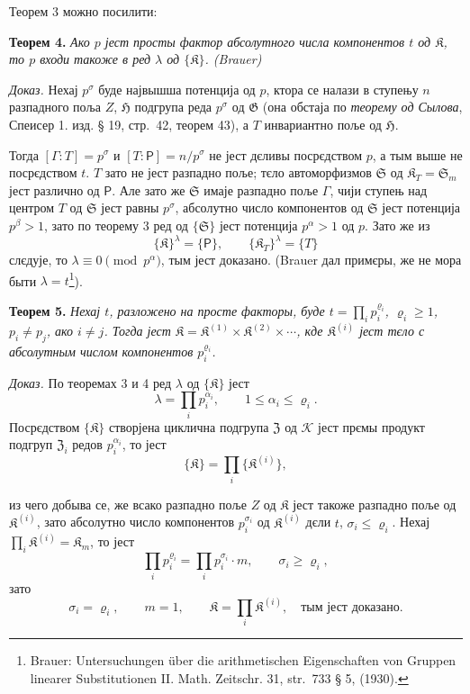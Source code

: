 \documentclass[11pt]{article}
\newcommand{\srcfn}[2]{\footnote{#2}}
\newcommand{\foreign}[1]{#1}
\begin{document}
Теорем 3 можно посилити:

\textbf{Теорем 4.} \emph{Ако \(p\) јест просты фактор абсолутного числа компонентов \(t\) од \(\mathfrak K\), то \(p\) входи такоже в ред \(\lambda\) од \(\{\mathfrak K\}\). (Brauer)}

\emph{Доказ.} Нехај \(p^\sigma\) буде највышша потенција од \(p\), ктора се налази в ступењу \(n\) разпадного поља \(Z\), \(\mathfrak H\) подгрупа реда \(p^\sigma\) од \(\mathfrak G\) (она обстаја по \emph{теорему од Сылова}, Спеисер 1. изд. § 19, стр.~42, теорем 43), а \(T\) инвариантно поље од \(\mathfrak H\).

Тогда \([\Gamma:T]=p^\sigma\) и \([T:\mathsf P]=n/p^\sigma\) не јест дєливы посрєдством \(p\), а тым выше не посрєдством \(t\). \(T\) зато не јест разпадно поље; тєло автоморфизмов \(\mathfrak S\) од \(\mathfrak K_T=\mathfrak S_m\) јест различно од \(\mathsf P\). Але зато же \(\mathfrak S\) имаје разпадно поље \(\Gamma\), чији ступењ над центром \(T\) од \(\mathfrak S\) јест равны \(p^\sigma\), абсолутно число компонентов од \(\mathfrak S\) јест потенција \(p^\beta>1\), зато по теорему 3 ред од \(\{\mathfrak S\}\) јест потенција \(p^\alpha>1\) од \(p\). Зато же из
\[
\{\mathfrak K\}^{\lambda}=\{\mathsf P\},
\qquad
\{\mathfrak K_T\}^{\lambda}=\{T\}
\]
слєдује, то \(\lambda\equiv0\pmod {p^\alpha}\), тым јест доказано. (Brauer дал примєры, же не мора быти \(\lambda=t\)\srcfn{1}{\foreign{Brauer: Untersuchungen über die arithmetischen Eigenschaften von Gruppen linearer Substitutionen II. Math. Zeitschr. 31, str.~733 § 5, (1930).}}).

\textbf{Теорем 5.} \emph{Нехај \(t\), разложено на просте факторы, буде \(t=\prod_i p_i^{\varrho_i}\), \(\varrho_i\ge1\), \(p_i\ne p_j\), ако \(i\ne j\). Тогда јест \(\mathfrak K=\mathfrak K^{(1)}\times\mathfrak K^{(2)}\times\cdots\), кде \(\mathfrak K^{(i)}\) јест тєло с абсолутным числом компонентов \(p_i^{\varrho_i}\).}

\emph{Доказ.} По теоремах 3 и 4 ред \(\lambda\) од \(\{\mathfrak K\}\) јест
\[
\lambda=\prod_i p_i^{\alpha_i},\qquad 1\le\alpha_i\le\varrho_i.
\]
Посрєдством \(\{\mathfrak K\}\) створјена циклична подгрупа \(\mathfrak Z\) од \(\mathscr K\) јест прємы продукт подгруп \(\mathfrak Z_i\) редов \(p_i^{\alpha_i}\), то јест
\[
\{\mathfrak K\}=\prod_i\{\mathfrak K^{(i)}\},
\]

из чего добыва се, же всако разпадно поље \(Z\) од \(\mathfrak K\) јест такоже разпадно поље од \(\mathfrak K^{(i)}\), зато абсолутно число компонентов \(p_i^{\sigma_i}\) од \(\mathfrak K^{(i)}\) дєли \(t\), \(\sigma_i\le\varrho_i\). Нехај \(\prod_i \mathfrak K^{(i)}=\mathfrak K_m\), то јест
\[
\prod_i p_i^{\varrho_i}=\prod_i p_i^{\sigma_i}\cdot m,
\qquad
\sigma_i\ge\varrho_i,
\]
зато
\[
\sigma_i=\varrho_i,\qquad m=1,\qquad
\mathfrak K=\prod_i \mathfrak K^{(i)},
\quad\text{тым јест доказано.}
\]
\end{document}
